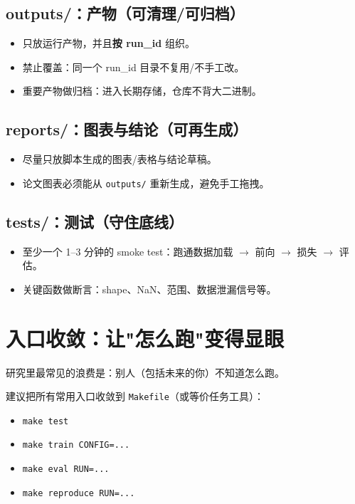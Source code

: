 \subsection{outputs/：产物（可清理/可归档）}
\begin{itemize}
  \item 只放运行产物，并且\textbf{按 run\_id} 组织。
  \item 禁止覆盖：同一个 run\_id 目录不复用/不手工改。
  \item 重要产物做归档：进入长期存储，仓库不背大二进制。
\end{itemize}

\subsection{reports/：图表与结论（可再生成）}
\begin{itemize}
  \item 尽量只放脚本生成的图表/表格与结论草稿。
  \item 论文图表必须能从 \texttt{outputs/} 重新生成，避免手工拖拽。
\end{itemize}

\subsection{tests/：测试（守住底线）}
\begin{itemize}
  \item 至少一个 1--3 分钟的 smoke test：跑通数据加载 $\rightarrow$ 前向 $\rightarrow$ 损失 $\rightarrow$ 评估。
  \item 关键函数做断言：shape、NaN、范围、数据泄漏信号等。
\end{itemize}

\section{入口收敛：让"怎么跑"变得显眼}
研究里最常见的浪费是：别人（包括未来的你）不知道怎么跑。

建议把所有常用入口收敛到 \texttt{Makefile}（或等价任务工具）：
\begin{itemize}
  \item \texttt{make test}
  \item \texttt{make train CONFIG=...}
  \item \texttt{make eval RUN=...}
  \item \texttt{make reproduce RUN=...}
\end{itemize}


